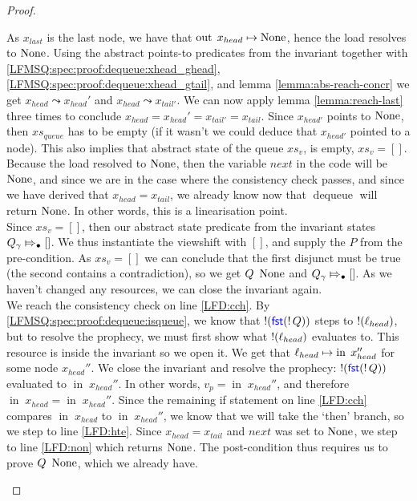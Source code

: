 \documentclass[a4paper, 11pt]{report}
\newcommand{\dequeue}{\operatorname{dequeue}}
\newcommand{\nIn}[1]{\operatorname{in} \; #1}
\newcommand{\nOut}[1]{\operatorname{out} \; #1}
\newcommand{\Qg}{Q_\gname}
\newcommand{\abstractstateauth}[2]{#1 \Mapsto_{\bullet} #2}
\newcommand{\reach}[2]{#1 \leadsto #2}
\begin{document}
\begin{proof}
\begin{itemize}
\begin{itemize}
      As $x_{last}$ is the last node, we have that $\nOut{x_{head}} \mapsto \None$, hence the load resolves to $\operatorname{None}$. Using the abstract points-to predicates from the invariant together with \ref{LFMSQ:spec:proof:dequeue:xhead_ghead}, \ref{LFMSQ:spec:proof:dequeue:xhead_gtail}, and lemma \ref{lemma:abs-reach-concr} we get $\reach{x_{head}}{x_{head}'}$ and $\reach{x_{head}}{x_{tail'}}$. We can now apply lemma \ref{lemma:reach-last} three times to conclude $x_{head} = x_{head}' = x_{tail'} = x_{tail}$. Since $x_{head'}$ points to $\operatorname{None}$, then $xs_{queue}$ has to be empty (if it wasn't we could deduce that $x_{head'}$ pointed to a node). This also implies that abstract state of the queue $xs_v$, is empty, $xs_v = []$.\\
      Because the load resolved to $\operatorname{None}$, then the variable $next$ in the code will be $\operatorname{None}$, and since we are in the case where the consistency check passes, and since we have derived that $x_{head} = x_{tail}$, we already know now that $\dequeue$ will return $\operatorname{None}$. In other words, this is a linearisation point.\\
      Since $xs_v = []$, then our abstract state predicate from the invariant states $\abstractstateauth{\Qg}{[]}$. We thus instantiate the viewshift with $[]$, and supply the $P$ from the pre-condition. As $xs_v = []$ we can conclude that the first disjunct must be true (the second contains a contradiction), so we get $Q \ \None$ and $\abstractstateauth{\Qg}{[]}$. As we haven't changed any resources, we can close the invariant again.\\
      We reach the consistency check on line \ref{LFD:cch}. By \ref{LFMSQ:spec:proof:dequeue:isqueue}, we know that $\mathop{!}(\operatorname{\textsf{\color{blue} fst}} (\mathop{!} Q))$ steps to $\mathop{!}(\ell_{head})$, but to resolve the prophecy, we must first show what $\mathop{!}(\ell_{head})$ evaluates to. This resource is inside the invariant so we open it. We get that $\loc_{head} \mapsto \nIn{x_{head}''}$ for some node $x_{head}''$. We close the invariant and resolve the prophecy: $\mathop{!}(\operatorname{\textsf{\color{blue} fst}} (\mathop{!} Q))$ evaluated to $\nIn{x_{head}''}$. In other words, $v_p = \nIn{x_{head}''}$, and therefore $\nIn{x_{head}} = \nIn{x_{head}''}$. Since the remaining if statement on line \ref{LFD:cch} compares $\nIn{x_{head}}$ to $\nIn{x_{head}''}$, we know that we will take the `then' branch, so we step to line \ref{LFD:hte}. Since $x_{head} = x_{tail}$ and $next$ was set to $\operatorname{None}$, we step to line \ref{LFD:non} which returns $\operatorname{None}$. The post-condition thus requires us to prove $Q \ \None$, which we already have.


\end{itemize}
\end{itemize}
\end{proof}
\end{document}
